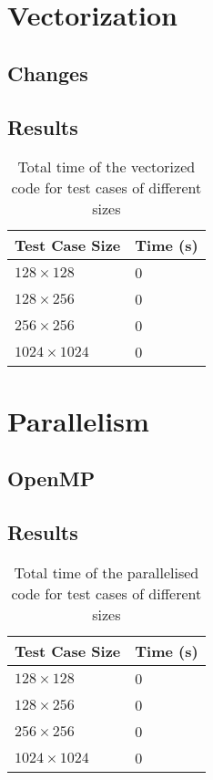 \documentclass[11pt, twocolumn, a4paper]{article}
\begin{document}
\section{Vectorization}

\subsection{Changes}

\subsection{Results}

\begin{table}[htbp]
    \begin{center}
    \caption{Total time of the vectorized code for test cases of different sizes}\label{tab:vectorized}
    \begin{tabular}{l | l} 
        \hline\hline
        Test Case Size&Time (s)\\
        \hline
        $128 \times 128$&0\\
        $128 \times 256$&0\\
        $256 \times 256$&0\\
        $1024 \times 1024$&0\\
        \hline
      \end{tabular}
    \end{center}
\end{table} 

\section{Parallelism}

\subsection{OpenMP}

\subsection{Results}

\begin{table}[htbp]
    \begin{center}
    \caption{Total time of the parallelised code for test cases of different sizes}\label{tab:parallelised}
    \begin{tabular}{l | l} 
        \hline\hline
        Test Case Size&Time (s)\\
        \hline
        $128 \times 128$&0\\
        $128 \times 256$&0\\
        $256 \times 256$&0\\
        $1024 \times 1024$&0\\
        \hline
      \end{tabular}
    \end{center}
\end{table} 

\clearpage

\onecolumn{
  \printbibliography
}
\end{document}
